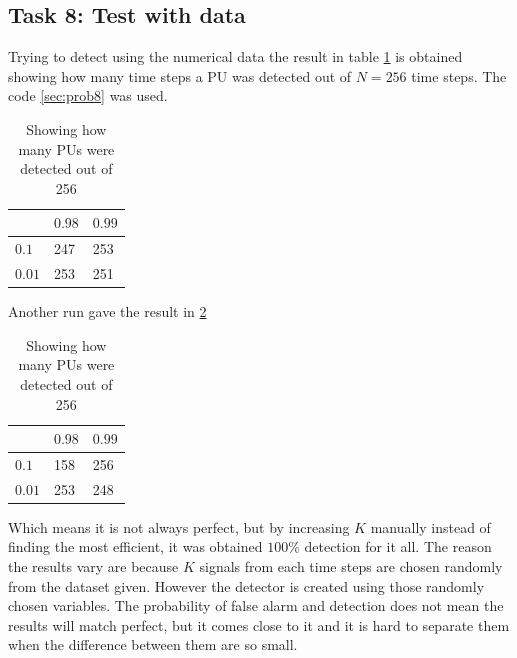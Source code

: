 \subsection{Task 8: Test with data}
Trying to detect using the numerical data the result in table \ref{tab:detection} is obtained showing how many time steps a PU was detected out of $N=256$ time steps. The code \ref{sec:prob8} was used.
\begin{table}[ht]
\centering
\begin{tabular}{|l||l|l|}
\hline
\backslashbox{$\alpha$}{$\beta$} & $0.98$  & $0.99$  \\ \hline\hline
$0.1$  & 247 &  253 \\ \hline
$0.01$ & 253 & 251 \\ \hline
\end{tabular}
\caption{Showing how many PUs were detected out of 256}
\label{tab:detection}
\end{table}
Another run gave the result in \ref{tab:detection2}
\begin{table}[ht]
\centering
\begin{tabular}{|l||l|l|}
\hline
\backslashbox{$\alpha$}{$\beta$} & $0.98$  & $0.99$  \\ \hline\hline
$0.1$  & 158 & 256 \\ \hline
$0.01$ & 253 & 248 \\ \hline
\end{tabular}
\caption{Showing how many PUs were detected out of 256}
\label{tab:detection2}
\end{table}
Which means it is not always perfect, but by increasing $K$ manually instead of finding the most efficient, it was obtained $100\%$ detection for it all. The reason the results vary are because $K$ signals from each time steps are chosen randomly from the dataset given. However the detector is created using those randomly chosen variables. The probability of false alarm and detection does not mean the results will match perfect, but it comes close to it and it is hard to separate them when the difference between them are so small.